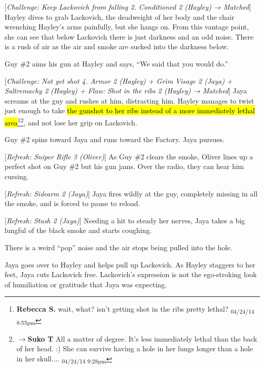 {[}\textit{Challenge: Keep Lackovich from falling 2.  Conditioned 2 (Hayley) → Matched}{]}  Hayley dives to grab Lackovich, the deadweight of her body and the chair wrenching Hayley's arms painfully, but she hangs on.  From this vantage point, she can see that below Lackovich there is just darkness and an odd noise.  There is a rush of air as the air and smoke are sucked into the darkness below.



Guy \#2 aims his gun at Hayley and says, ``We said that you would do.''



{[}\textit{Challenge: Not get shot 4.  Armor 2 (Hayley) + Grim Visage 2 (Jaya) + Saltremachy 2 (Hayley) + Flaw: Shot in the ribs 2 (Hayley) → Matched}{]}  Jaya screams at the guy and rushes at him, distracting him.  Hayley manages to twist just enough to take \hl{the gunshot to her ribs instead of a more immediately lethal area}\footnote{\textbf{Rebecca S. }wait, what? isn't getting shot in the ribs pretty lethal? \textsubscript{04/24/14 8:55pm}}\footnote{$\rightarrow$\textbf{Suko T }All a matter of degree.  It's less immediately lethal than the back of her head. :)  She can survive having a hole in her lungs longer than a hole in her skull.... \textsubscript{04/24/14 9:28pm}}, and not lose her grip on Lackovich.



Guy \#2 spins toward Jaya and runs toward the Factory.  Jaya pursues.



{[}\textit{Refresh: Sniper Rifle 3 (Oliver)}{]}  As Guy \#2 clears the smoke, Oliver lines up a perfect shot on Guy \#2 but his gun jams.  Over the radio, they can hear him cursing.



{[}\textit{Refresh: Sidearm 2 (Jaya)}{]}  Jaya fires wildly at the guy, completely missing in all the smoke, and is forced to pause to reload.



{[}\textit{Refresh: Stash 2 (Jaya)}{]}  Needing a hit to steady her nerves, Jaya takes a big lungful of the black smoke and starts coughing.



There is a weird ``pop'' noise and the air stops being pulled into the hole.



Jaya goes over to Hayley and helps pull up Lackovich.  As Hayley staggers to her feet, Jaya cuts Lackovich free.  Lackovich's expression is not the ego-stroking look of humiliation or gratitude that Jaya was expecting.



